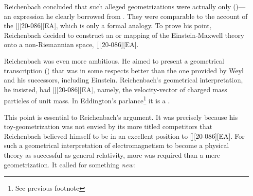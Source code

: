 \documentclass[draft]{article}
\begin{document}
Reichenbach concluded that such alleged geometrizations were actually only  ()---an expression he clearly borrowed from \citet[294ff.]{Eddington1925a}. They were comparable to the account of the [][20-086][EA], which is only a formal analogy. To prove his point, Reichenbach decided to construct an  or mapping of the Einstein-Maxwell theory onto a non-Riemannian space, [][20-086\me][EA]. 

Reichenbach was even more ambitious. He aimed to present a geometrical transcription () that was in some respects better than the one provided by Weyl and his successors, including Einstein. Reichenbach's geometrical interpretation, he insisted, had [][20-086\me][EA], namely, the velocity-vector of charged mass particles of unit mass. In Eddington's parlance\footnote{See previous footnote} it is a .

This point is essential to Reichenbach's argument. It was precisely because his toy-geometrization was not envied by its more titled competitors that Reichenbach believed himself to be in an excellent position to [][20-086][EA]. For such a geometrical interpretation of electromagnetism to become a physical theory as successful as general relativity, more was required than a mere geometrization. It called for something \emph{new}:
\end{document}
